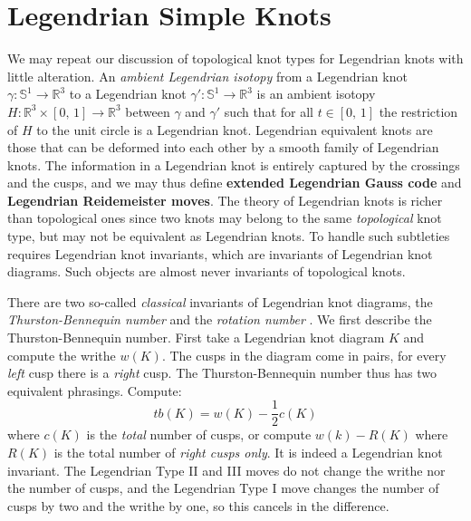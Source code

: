 \section{Legendrian Simple Knots}
    We may repeat our discussion of topological knot types for Legendrian
    knots with little alteration. An \textit{ambient Legendrian isotopy} from
    a Legendrian knot $\gamma:\mathbb{S}^{1}\rightarrow\mathbb{R}^{3}$ to a
    Legendrian knot $\gamma':\mathbb{S}^{1}\rightarrow\mathbb{R}^{3}$ is an
    ambient isotopy $H:\mathbb{R}^{3}\times[0,\,1]\rightarrow\mathbb{R}^{3}$
    between $\gamma$ and $\gamma'$ such that for all $t\in[0,\,1]$ the
    restriction of $H$ to the unit circle is a Legendrian knot. Legendrian
    equivalent knots are those that can be deformed into each other by a
    smooth family of Legendrian knots. The information in a Legendrian knot is
    entirely captured by the crossings and the cusps, and we may thus define
    \textbf{extended Legendrian Gauss code} and
    \textbf{Legendrian Reidemeister moves}. The theory of Legendrian knots is
    richer than topological ones since two knots may belong to the same
    \textit{topological} knot type, but may not be equivalent as Legendrian
    knots. To handle such subtleties requires Legendrian knot invariants, which
    are invariants of Legendrian knot diagrams. Such objects are almost never
    invariants of topological knots.
    \par\hfill\par
    There are two so-called \textit{classical} invariants of Legendrian knot
    diagrams, the \textit{Thurston-Bennequin number} and the
    \textit{rotation number} \cite{Ding2006LEGENDRIANHA}. We first describe the
    Thurston-Bennequin number. First take a Legendrian knot diagram $K$ and
    compute the writhe $w(K)$. The
    cusps in the diagram come in pairs, for every \textit{left} cusp there is
    a \textit{right} cusp. The Thurston-Bennequin number thus has two
    equivalent phrasings. Compute:
    \begin{equation}
        tb(K)=w(K)-\frac{1}{2}c(K)
    \end{equation}
    where $c(K)$ is the \textit{total} number of cusps, or compute
    $w(k)-R(K)$ where $R(K)$ is the total number of \textit{right cusps only}.
    It is indeed a Legendrian knot invariant. The Legendrian Type II and III
    moves do not change the writhe nor the number of cusps, and the Legendrian
    Type I move changes the number of cusps by two and the writhe by one, so
    this cancels in the difference.
